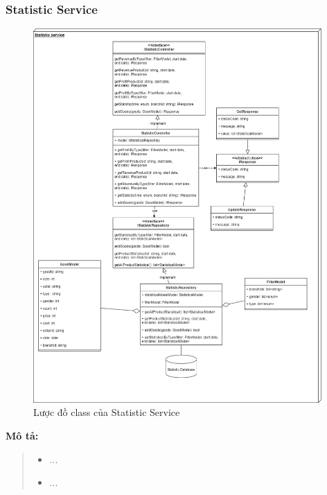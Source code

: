\subsubsection{Statistic Service}
\begin{figure}[!htp]
	\centering
	\includegraphics[width=11cm]{img/Architecture/service/StatisticService.png}
	\newline
	\caption{Lược đồ class của Statistic Service}
\end{figure}
\textbf{Mô tả:}
\begin{quote}
	\begin{itemize}
		\item ...
		\item ...
	\end{itemize}
\end{quote}

